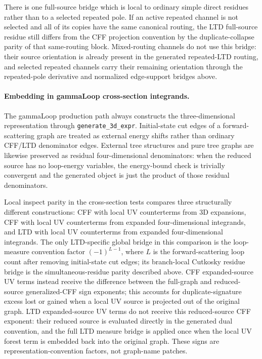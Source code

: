 \documentclass[11pt,a4paper]{report}
\begin{document}
There is one full-source bridge which is local to ordinary simple direct
residues rather than to a selected repeated pole.  If an active repeated
channel is not selected and all of its copies have the same canonical routing,
the LTD full-source residue still differs from the CFF projection convention by
the duplicate-collapse parity of that same-routing block.  Mixed-routing
channels do not use this bridge: their source orientation is already present in
the generated repeated-LTD routing, and selected repeated channels carry their
remaining orientation through the repeated-pole derivative and normalized
edge-support bridges above.

\paragraph{Embedding in gammaLoop cross-section integrands.}
The gammaLoop production path always constructs the three-dimensional
representation through \texttt{generate\_3d\_expr}.  Initial-state cut edges of a
forward-scattering graph are treated as external energy shifts rather than
ordinary CFF/LTD denominator edges.  External tree structures and pure tree
graphs are likewise preserved as residual four-dimensional denominators: when
the reduced source has no loop-energy variables, the energy-bound check is
trivially convergent and the generated object is just the product of those
residual denominators.

Local inspect parity in the cross-section tests compares three structurally
different constructions: CFF with local UV counterterms from 3D expansions, CFF
with local UV counterterms from expanded four-dimensional integrands, and LTD
with local UV counterterms from expanded four-dimensional integrands.  The only
LTD-specific global bridge in this comparison is the loop-measure convention
factor \((-1)^{L-1}\), where \(L\) is the forward-scattering loop count after
removing initial-state cut edges; its branch-local Cutkosky residue bridge is
the simultaneous-residue parity described above.  CFF expanded-source UV terms
instead receive the difference between the full-graph and reduced-source
generalized-CFF sign exponents; this accounts for duplicate-signature excess
lost or gained when a local UV source is projected out of the original graph.
LTD expanded-source UV terms do not receive this reduced-source CFF exponent:
their reduced source is evaluated directly in the generated dual convention,
and the full LTD measure bridge is applied once when the local UV forest term
is embedded back into the original graph.  These signs are
representation-convention factors, not graph-name patches.
\end{document}
